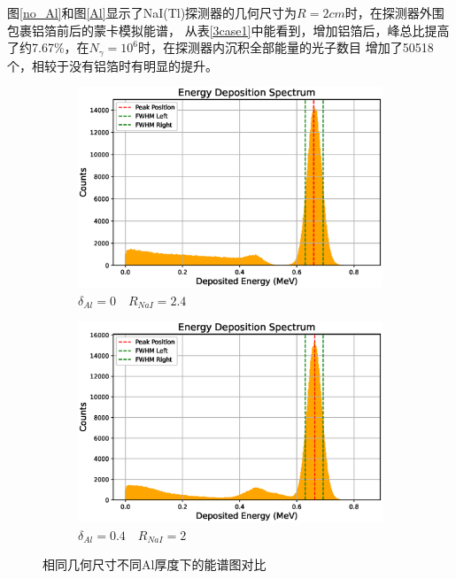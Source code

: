\documentclass{article}
\begin{document}
图\ref{no_Al}和图\ref{Al}显示了NaI(Tl)探测器的几何尺寸为$R=2cm$时，在探测器外围包裹铝箔前后的蒙卡模拟能谱，
从表\ref{3case1}中能看到，增加铝箔后，峰总比提高了约7.67\%，在$N_{\gamma }=10^6$时，在探测器内沉积全部能量的光子数目
增加了50518个，相较于没有铝箔时有明显的提升。
\begin{figure}[H]
    \centering
    \begin{subfigure}[b]{0.3\textwidth}
        \centering
        \includegraphics[width=\textwidth]{003.eps}
        \caption{$\delta _{Al}=0\quad R_{NaI}=2.4$}
        \label{R_no_Al}
    \end{subfigure}
    \hspace{5pt} %
    \begin{subfigure}[b]{0.3\textwidth}
        \centering
        \includegraphics[width=\textwidth]{004.eps}
        \caption{$\delta _{Al}=0.4\quad R_{NaI}=2$}
        \label{R_Al}
    \end{subfigure}
    \caption{相同几何尺寸不同Al厚度下的能谱图对比}
\end{figure}
\end{document}
